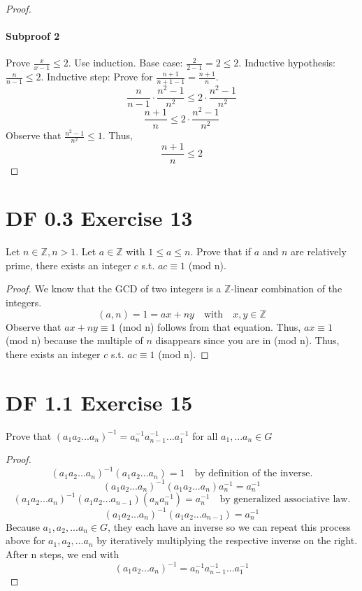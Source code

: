 \documentclass{article}
\begin{document}
\begin{proof}
\paragraph{Subproof 2}
Prove $\frac{x}{x-1} \leq 2$. Use induction. Base case: $\frac{2}{2-1} = 2 \leq 2$. Inductive hypothesis: $\frac{n}{n-1} \leq 2$. Inductive step: Prove for $\frac{n+1}{n+1-1} = \frac{n+1}{n}$.
\[
\frac{n}{n-1} \cdot \frac{n^2-1}{n^2} \leq 2 \cdot \frac{n^2-1}{n^2}
\]
\[
\frac{n+1}{n} \leq 2 \cdot \frac{n^2-1}{n^2}
\]
Observe that $\frac{n^2-1}{n^2} \leq 1$. Thus,
\[
\frac{n+1}{n} \leq 2
\]

\end{proof}

\section{DF 0.3 Exercise 13}

Let $n \in \mathbb{Z}, n>1$. Let $a \in \mathbb{Z}$ with $1 \leq a \leq n$. Prove that if $a$ and $n$ are relatively prime, there exists an integer $c$ s.t. $ac \equiv 1$ (mod n).

\begin{proof}
We know that the GCD of two integers is a $\mathbb{Z}$-linear combination of the integers.
\[ (a, n) = 1 = ax + ny \quad \textrm{with} \quad x,y \in \mathbb{Z} \]
Observe that $ax + ny \equiv 1$ (mod n) follows from that equation. Thus, $ax \equiv 1$ (mod n) because the multiple of $n$ disappears since you are in (mod n). 
Thus, there exists an integer $c$ s.t. $ac \equiv 1$ (mod n).
\end{proof}

\section{DF 1.1 Exercise 15}
Prove that $(a_1a_2...a_n)^{-1} = a_n^{-1}a_{n-1}^{-1}...a_1^{-1}$ for all $a_1,...a_n \in G$
\begin{proof}
\[
(a_1a_2...a_n)^{-1}(a_1a_2...a_n) = 1 \quad \textrm{by definition of the inverse.}
\]
\[
(a_1a_2...a_n)^{-1}(a_1a_2...a_n)a_n^{-1} = a_n^{-1}
\]
\[
(a_1a_2...a_n)^{-1}(a_1a_2...a_{n-1})(a_n a_n^{-1}) = a_n^{-1} \quad \textrm{by generalized associative law.}
\]
\[
(a_1a_2...a_n)^{-1}(a_1a_2...a_{n-1}) = a_n^{-1}
\]
Because $a_1, a_2, ... a_n \in G$, they each have an inverse so we can repeat this process above for $a_1, a_2, ...a_n$ by iteratively multiplying the respective inverse on the right.
After n steps, we end with
\[
(a_1a_2...a_n)^{-1} = a_n^{-1}a_{n-1}^{-1}...a_1^{-1}
\]
\end{proof}
\end{document}
